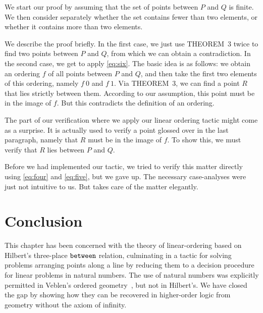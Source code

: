 We start our proof by assuming that the set of points between $P$ and $Q$ is finite. We then consider separately whether the set contains fewer than two elements, or whether it contains more than two elements. 

We describe the proof briefly. In the first case, we just use THEOREM~3 twice to find two points between $P$ and $Q$, from which we can obtain a contradiction. In the second case, we get to apply \ref{eq:six}. The basic idea is as follows: we obtain an ordering $f$ of all points between $P$ and $Q$, and then take the first two elements of this ordering, namely $f\ 0$ and $f\ 1$. Via THEOREM~3, we can find a point $R$ that lies strictly between them. According to our assumption, this point must be in the image of $f$. But this contradicts the definition of an ordering.

The part of our verification where we apply our linear ordering tactic might come as a surprise. It is actually used to verify a point glossed over in the last paragraph, namely that $R$ must be in the image of $f$. To show this, we must verify that $R$ lies between $P$ and $Q$.

Before we had implemented our tactic, we tried to verify this matter directly using \ref{eq:four} and \ref{eq:five}, but we gave up. The necessary case-analyses were just not intuitive to us. But  takes care of the matter elegantly.

\linebreak

\section{Conclusion}
This chapter has been concerned with the theory of linear-ordering based on Hilbert's three-place $\texttt{between}$ relation, culminating in a tactic for solving problems arranging points along a line by reducing them to a decision procedure for linear problems in natural numbers. The use of natural numbers was explicitly permitted in Veblen's ordered geometry~\cite{Veblenphd}, but not in Hilbert's. We have closed the gap by showing how they can be recovered in higher-order logic from geometry without the axiom of infinity.

